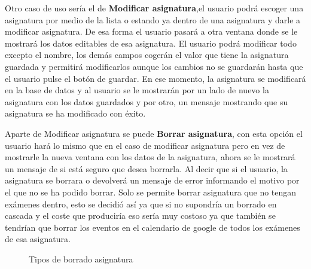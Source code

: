 Otro caso de uso sería el de \textbf{Modificar asignatura},el usuario podrá escoger una asignatura por medio de la lista o estando ya dentro de una asignatura y darle a modificar asignatura. De esa forma el usuario pasará a otra ventana donde se le mostrará los datos editables de esa asignatura.
El usuario podrá modificar todo excepto el nombre, los demás campos cogerán el valor que tiene la asignatura guardada y permitirá modificarlos aunque los  cambios no se guardarán hasta que el usuario pulse el botón de guardar.
En ese momento, la asignatura se modificará en la base de datos y al usuario se le mostrarán por un lado de nuevo la asignatura con los datos guardados y por otro, un mensaje mostrando que su asignatura se ha modificado con éxito.


Aparte de Modificar asignatura se puede \textbf{Borrar asignatura}, con esta opción el usuario hará lo mismo que en el caso de modificar asignatura pero en vez de mostrarle la nueva ventana con los datos de la asignatura, ahora se le mostrará un mensaje de si está seguro que desea borrarla.
Al decir que si el usuario, la asignatura se borrara o devolverá un mensaje de error informando el motivo por el que no se ha podido borrar.
Solo se permite borrar asignatura que no tengan exámenes dentro, esto se decidió así ya que si no supondría un borrado en cascada y el coste que produciría eso sería muy costoso ya que también se tendrían que borrar los eventos en el calendario de google de todos los exámenes de esa asignatura.


\begin{figure}[H]
 \centering
 \caption{Tipos de borrado asignatura}
 \label{f:Tipos de borrado asignatura}
\end{figure}

